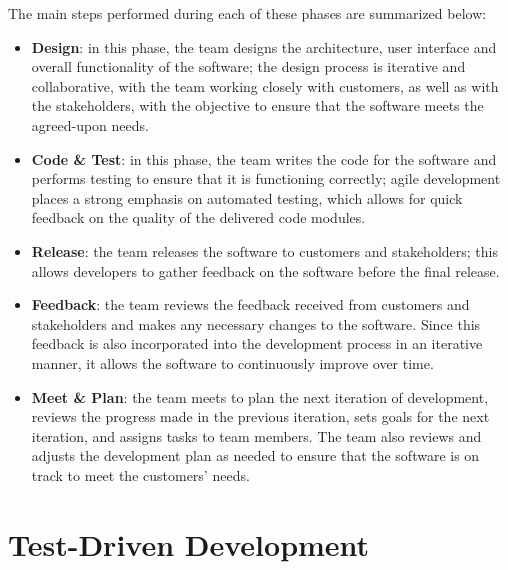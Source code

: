 \noindent The main steps performed during each of these phases are summarized below:
\begin{itemize}
    \item \textbf{Design}: in this phase, the team designs the architecture, user interface and overall functionality of the software; the design process is iterative and collaborative, with the team working closely with customers, as well as with the stakeholders, with the objective to ensure that the software meets the agreed-upon needs.
    \item \textbf{Code \& Test}: in this phase, the team writes the code for the software and performs testing to ensure that it is functioning correctly; agile development places a strong emphasis on automated testing, which allows for quick feedback on the quality of the delivered code modules.
    \item \textbf{Release}: the team releases the software to customers and stakeholders; this allows developers to gather feedback on the software before the final release.
    \item \textbf{Feedback}: the team reviews the feedback received from customers and stakeholders and makes any necessary changes to the software. Since this feedback is also incorporated into the development process in an iterative manner, it allows the software to continuously improve over time.
    \item \textbf{Meet \& Plan}: the team meets to plan the next iteration of development, reviews the progress made in the previous iteration, sets goals for the next iteration, and assigns tasks to team members. The team also reviews and adjusts the development plan as needed to ensure that the software is on track to meet the customers' needs.
\end{itemize}



\section{Test-Driven Development}
